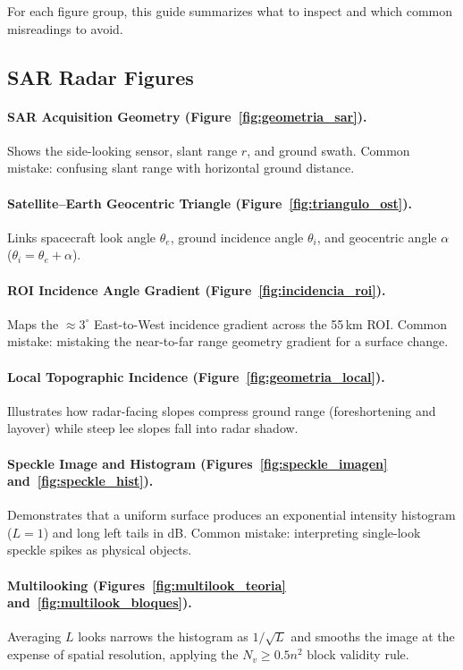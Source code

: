 \documentclass[11pt,a4paper]{article}
\begin{document}
For each figure group, this guide summarizes what to inspect and which common misreadings to avoid.

\subsection*{SAR Radar Figures}

\paragraph{SAR Acquisition Geometry (Figure~\ref{fig:geometria_sar}).} Shows the side-looking sensor, slant range $r$, and ground swath. Common mistake: confusing slant range with horizontal ground distance.

\paragraph{Satellite--Earth Geocentric Triangle (Figure~\ref{fig:triangulo_ost}).} Links spacecraft look angle $\theta_e$, ground incidence angle $\theta_i$, and geocentric angle $\alpha$ ($\theta_i=\theta_e+\alpha$).

\paragraph{ROI Incidence Angle Gradient (Figure~\ref{fig:incidencia_roi}).} Maps the $\approx 3^\circ$ East-to-West incidence gradient across the 55\,km ROI. Common mistake: mistaking the near-to-far range geometry gradient for a surface change.

\paragraph{Local Topographic Incidence (Figure~\ref{fig:geometria_local}).} Illustrates how radar-facing slopes compress ground range (foreshortening and layover) while steep lee slopes fall into radar shadow.

\paragraph{Speckle Image and Histogram (Figures~\ref{fig:speckle_imagen} and~\ref{fig:speckle_hist}).} Demonstrates that a uniform surface produces an exponential intensity histogram ($L=1$) and long left tails in dB. Common mistake: interpreting single-look speckle spikes as physical objects.

\paragraph{Multilooking (Figures~\ref{fig:multilook_teoria} and~\ref{fig:multilook_bloques}).} Averaging $L$ looks narrows the histogram as $1/\sqrt{L}$ and smooths the image at the expense of spatial resolution, applying the $N_v \ge 0.5n^2$ block validity rule.
\end{document}
